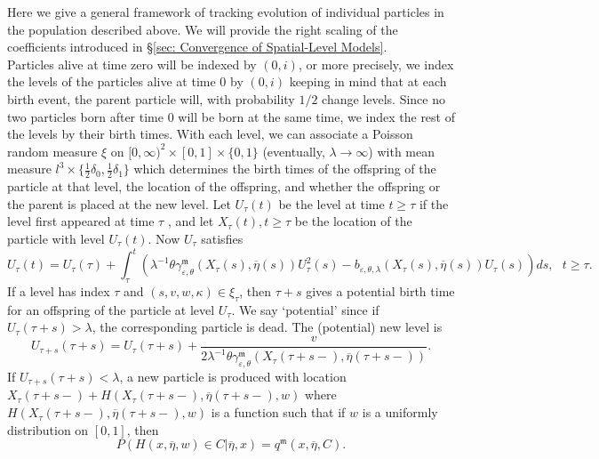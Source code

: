 \documentclass[12pt]{article}
\begin{document}
Here we give a general framework of tracking evolution of individual particles in the population described above. We will provide the right scaling of the coefficients introduced in \S \ref{sec: Convergence of Spatial-Level Models}.\\
Particles alive at time zero will be indexed by
$(0, i)$, or more precisely, we index the levels of the particles alive at time $0$ by $(0, i)$ keeping
in mind that at each birth event, the parent particle will, with probability $1/2$ change levels.
Since no two particles born after time $0$ will be born at the same time, we index the rest of
the levels by their birth times. With each level, we can associate a Poisson random measure
$\xi$ on $[0, \infty)^2\times [0,1]\times \{0,1\}$ (eventually, $\lambda \to \infty$) with mean measure $l^3 \times \{\frac{1}{2}\delta_0,\frac{1}{2}\delta_1\}$ which
determines the birth times of the offspring of the particle at that level, the location of the
offspring, and whether the offspring or the parent is placed at the new level. Let $U_{\tau}(t)$ be
the level at time $t \geq \tau$ if the level first appeared at time $\tau$ , and let $X_{\tau}(t), t \geq \tau$ be the
location of the particle with level $U_{\tau}(t)$. 
Now $U_{\tau}$ satisfies
\begin{equation}
U_{\tau}(t)=U_{\tau}(\tau)+\int_{\tau}^{t}(\lambda^{-1} \theta \gamma^{\mathfrak{m}}_{\varepsilon,\theta}(X_{\tau}(s),\overline{\eta}(s))U^2_{\tau}(s)-b_{\varepsilon,\theta,\lambda}(X_{\tau}(s),\overline{\eta}(s))U_{\tau}(s))ds, ~~~ t \geq \tau.    
\end{equation}
If a level has index $\tau$ and $(s,v,w,\kappa)\in \xi_\tau$, then $\tau+s$ gives a potential birth time for an offspring of the particle at level $U_{\tau}$. We say `potential' since if $U_{\tau}(\tau+s)>\lambda$, the corresponding particle is dead. The (potential) new level is 
\begin{equation}\label{New birth potential level}
    U_{\tau+s}(\tau+s)=U_{\tau}(\tau+s)+ \frac{v}{2\lambda^{-1} \theta \gamma^{\mathfrak{m}}_{\varepsilon,\theta}(X_{\tau}(\tau+s-), \overline{\eta}(\tau+s-))}.
\end{equation}
If $U_{\tau+s}(\tau+s)< \lambda$, a new particle is produced with location $X_{\tau}(\tau+s-)+H(X_{\tau}(\tau+s-), \overline{\eta}(\tau+s-),w)$ where $H(X_{\tau}(\tau+s-), \overline{\eta}(\tau+s-),w)$ is a function such that if $w$ is a uniformly distribution on $[0,1]$, then 
\begin{equation}\label{eq: Individual Evolution Jump Kernel}
P(H(x, \overline{\eta},w)\in C | \overline{\eta},x)=q^{\mathfrak{m}}(x, \overline{\eta},C).    
\end{equation}
\end{document}
